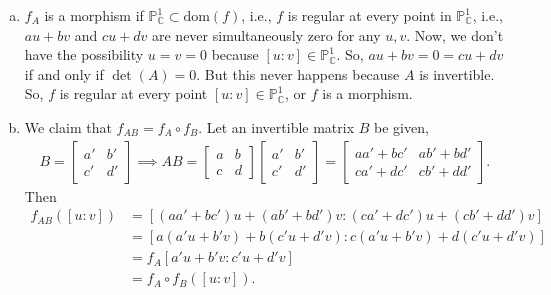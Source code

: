 \documentclass[12pt]{article}
\begin{document}
\begin{enumerate}[(a)]
	\item $f_A$ is a morphism if $\mathbb{P}^1_{\mathbb{C}} \subset \mbox{dom}(f)$, i.e., $f$ is regular at every point in $\mathbb{P}^1_{\mathbb{C}}$, i.e., $au+bv$ and $cu+dv$ are never simultaneously zero for any $u,v$. Now, we don't have the possibility $u=v=0$ because $[u:v] \in \mathbb{P}^1_{\mathbb{C}}$. So, $au+bv = 0 = cu+dv$ if and only if $\det(A) = 0$. But this never happens because $A$ is invertible. So, $f$ is regular at every point $[u:v] \in \mathbb{P}^1_{\mathbb{C}}$, or $f$ is a morphism. 
	
	
	\item We claim that $f_{AB} = f_A \circ f_B$. Let an invertible matrix $B$ be given, 
	\begin{align*}
	B= \begin{bmatrix}
	a' & b' \\ c' & d'
	\end{bmatrix} \implies AB = \begin{bmatrix}
	a&b\\c&d
	\end{bmatrix}\begin{bmatrix}
	a'&b'\\c'&d'
	\end{bmatrix} =  \begin{bmatrix}
	aa' + bc' & ab' + bd' \\ ca' + dc' & cb' + dd'
	\end{bmatrix}.
	\end{align*}
	Then 
	\begin{align*}
	f_{AB}([u:v]) &= [(aa'+bc')u + (ab'+bd')v : (ca'+dc')u + (cb'+dd')v]\\
	&= [a(a'u + b'v) + b(c'u+d'v) :  c(a'u + b'v) + d(c'u+d'v)]\\
	&= f_A[a'u + b'v : c'u+d'v]\\
	&= f_A\circ f_B([u:v]).
	\end{align*}
	

\end{enumerate}
\end{document}
